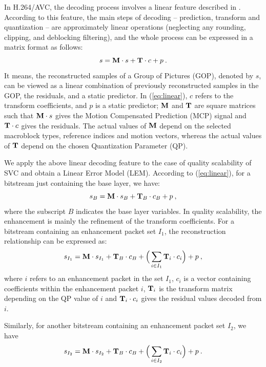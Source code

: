 \documentclass[journal]{IEEEtran}
\begin{document}
In H.264/AVC, the decoding process involves a linear feature described in \cite{Winken08}. According to this feature, the main steps of decoding -- prediction, transform and quantization -- are approximately linear operations (neglecting any rounding, clipping, and deblocking filtering), and the whole process can be expressed in a matrix format as follows:
\begin{equation}
\label{eq:linear}
s = {\rm\bf M} \cdot s + {\rm\bf T} \cdot c + p \: .
\end{equation}
It means, the reconstructed samples of a Group of Pictures (GOP), denoted by $s$, can be viewed as a linear combination of previously reconstructed samples in the GOP, the residuals, and a static predictor. In (\ref{eq:linear}), $c$ refers to the transform coefficients, and $p$ is a static predictor; ${\rm\bf M}$ and ${\rm\bf T}$ are square matrices such that ${\rm\bf M} \cdot s$ gives the Motion Compensated Prediction (MCP) signal and ${\rm\bf T} \cdot c$ gives the residuals. The actual values of ${\rm\bf M}$ depend on the selected macroblock types, reference indices and motion vectors, whereas the actual values of ${\rm\bf T}$ depend on the chosen Quantization Parameter (QP).

We apply the above linear decoding feature to the case of quality scalability of SVC and obtain a Linear Error Model (LEM). According to (\ref{eq:linear}), for a bitstream just containing the base layer, we have:
\begin{equation}
\label{eq:base0}
s_{B} = {\rm\bf M} \cdot s_{B} + {\rm\bf T}_{B} \cdot c_{B} + p \: ,
\end{equation}
where the subscript $B$ indicates the base layer variables. In quality scalability, the enhancement is mainly the refinement of the transform coefficients. For a bitstream containing an enhancement packet set $I_1$, the reconstruction relationship can be expressed as:
\begin{equation}
\label{eq:subset1}
s_{I_1} = {\rm\bf M} \cdot s_{I_1} + {\rm\bf T}_{B} \cdot c_{B} + \Big( \sum_{i \in I_1}{\rm\bf T}_i \cdot c_i \Big) + p \: ,
\end{equation}
where $i$ refers to an enhancement packet in the set $I_1$, $c_i$ is a vector containing coefficients within the enhancement packet $i$, ${\rm\bf T}_i$ is the transform matrix depending on the QP value of $i$ and ${\rm\bf T}_i \cdot c_i$ gives the residual values decoded from $i$.

Similarly, for another bitstream containing an enhancement packet set $I_2$, we have
\begin{equation}
\label{eq:subset2}
s_{I_2} = {\rm\bf M} \cdot s_{I_2} + {\rm\bf T}_{B} \cdot c_{B} + \Big( \sum_{i \in I_2}{\rm\bf T}_i \cdot c_i \Big) + p \: .
\end{equation}
\end{document}

